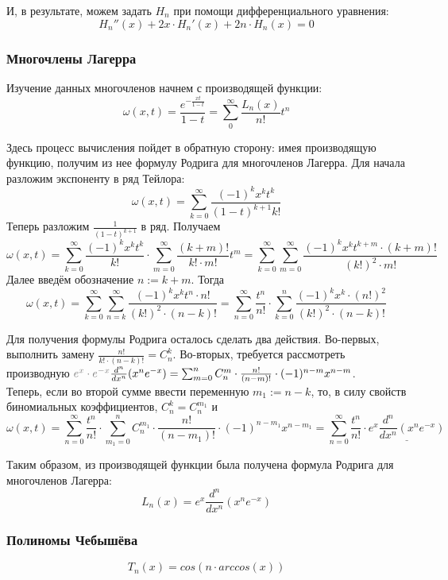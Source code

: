 \documentclass[12pt]{article}
\begin{document}
		И, в результате, можем задать $H_n$ при помощи дифференциального уравнения:
		$$H_n''(x) + 2x \cdot H_n'(x) + 2n \cdot H_n(x) = 0$$
	
		\subsubsection{Многочлены Лагерра}
	
		Изучение данных многочленов начнем с производящей функции:
		$$ \omega(x,t) = \frac{e^{-\frac{xt}{1-t}}}{1 - t} = \sum_0^{\infty} \frac{L_n(x)}{n!} t^n$$
	
		Здесь процесс вычисления пойдет в обратную сторону: имея производящую функцию, получим из нее формулу Родрига для
		многочленов Лагерра. Для начала разложим экспоненту в ряд Тейлора:
		$$ \omega(x,t) = \sum_{k=0}^{\infty} \frac{(-1)^k x^k t^k}{(1-t)^{k+1} k!}$$
		Теперь разложим $\frac{1}{(1-t)^{k+1}}$ в ряд. Получаем
		$$ \omega(x,t) = \sum_{k=0}^{\infty} \frac{(-1)^k x^k t^k}{k!} \cdot \sum_{m=0}^{\infty} \frac{(k+m)!}{k! \cdot m!} t^m
		 = \sum_{k=0}^{\infty} \sum_{m=0}^{\infty} \frac{(-1)^k x^k t^{k+m} \cdot (k+m)!}{(k!)^2 \cdot m!} $$
		Далее введём обозначение $n := k+m$. Тогда
		$$ \omega(x,t) = \sum_{k=0}^{\infty} \sum_{n=k}^{\infty} \frac{(-1)^k x^k t^n \cdot n!}{(k!)^2 \cdot (n-k)!}
		 = \sum_{n=0}^{\infty} \frac{t^n}{n!} \cdot \sum_{k=0}^{n} \frac{(-1)^k x^k \cdot (n!)^2}{(k!)^2 \cdot (n-k)!}$$
		 
		Для получения формулы Родрига осталось сделать два действия. Во-первых, выполнить замену $\frac{n!}{k! \cdot (n-k)!} = C_n^k$.
		Во-вторых, требуется рассмотреть производную ${\color{gray}e^x \cdot e^{-x}} \frac{d^n}{dx^n}(x^n e^{-x}) 
		= \sum_{m=0}^n C_n^m \cdot \frac{n!}{(n-m)!} \cdot (-1)^{n-m} x^{n-m}$. \\
		Теперь, если во второй сумме ввести переменную $m_1 := n - k$, то, в силу свойств биномиальных коэффициентов, $C_n^k = C_n^{m_1}$ и
		$$\omega(x,t) = \sum_{n=0}^{\infty} \frac{t^n}{n!} \cdot \sum_{m_1=0}^{n} C_n^{m_1} \cdot \frac{n!}{(n-m_1)!}
		\cdot (-1)^{n-m_1} x^{n-m_1} = \sum_{n=0}^{\infty} \frac{t^n}{n!} \cdot \underline{e^x \frac{d^n}{dx^n}(x^n e^{-x})}$$
	
		Таким образом, из производящей функции была получена формула Родрига для многочленов Лагерра:
		$$L_n(x) = e^x \frac{d^n}{dx^n}(x^n e^{-x})$$
	
		\subsubsection{Полиномы Чебышёва}
		$$T_n(x) = cos(n \cdot arccos(x))$$
\end{document}
